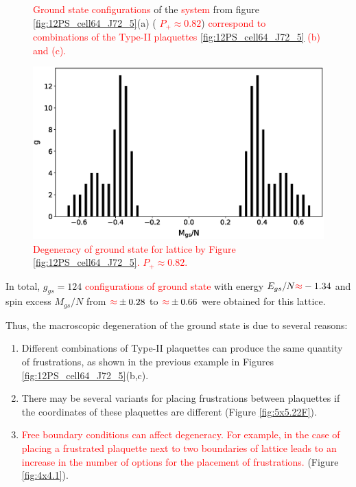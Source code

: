 \documentclass[preprint,12pt]{elsarticle}
\begin{document}
\begin{figure}[H]
\begin{minipage}[h]{0.3\linewidth}
		\end{minipage}
		\caption{\textcolor{red}{Ground state configurations} of the \textcolor{red}{system} from figure \ref{fig:12PS_cell64_J72_5}(a) (\textcolor{red}{  $P_+\approx0.82$}) \textcolor{red}{correspond to combinations of the Type-II plaquettes \ref{fig:12PS_cell64_J72_5} (b) and (c).}}
		\label{fig:12F_cell64_J72_5}
	\end{figure}
	
	\begin{figure}[H]
		\centering
		\includegraphics[width=0.8\linewidth]{pictures/g_Mgs.eps}
		\caption{\textcolor{red}{Degeneracy of ground state for lattice by Figure \ref{fig:12PS_cell64_J72_5}. $P_+\approx0.82$.}}
		\label{fig:g_Mgs}
	\end{figure}
	
	In total, $g_{gs}=124$ \textcolor{red}{configurations of ground state} with energy $E_{gs}/N\textcolor{red}{\approx}-1.34$ and spin excess $M_{gs}/N$ from $\textcolor{red}{\approx}\pm 0.28$ to $\textcolor{red}{\approx}\pm 0.66$ were obtained for this lattice. 
	
	Thus, the macroscopic degeneration of the ground state is due to several reasons:
	
	\begin{enumerate}
		\item Different combinations of Type-II plaquettes can produce the same quantity of frustrations, as shown in the previous example in Figures \ref{fig:12PS_cell64_J72_5}(b,c).
		\item There may be several variants for placing frustrations between plaquettes if the coordinates of these plaquettes are different (Figure \ref{fig:5x5.22F}).
		\item \textcolor{red}{Free boundary conditions can affect degeneracy. For example, in the case of placing a frustrated plaquette next to two boundaries of lattice leads to an increase in the number of options for the placement of frustrations.} (Figure \ref{fig:4x4.1}).
	\end{enumerate}
	
\end{document}
